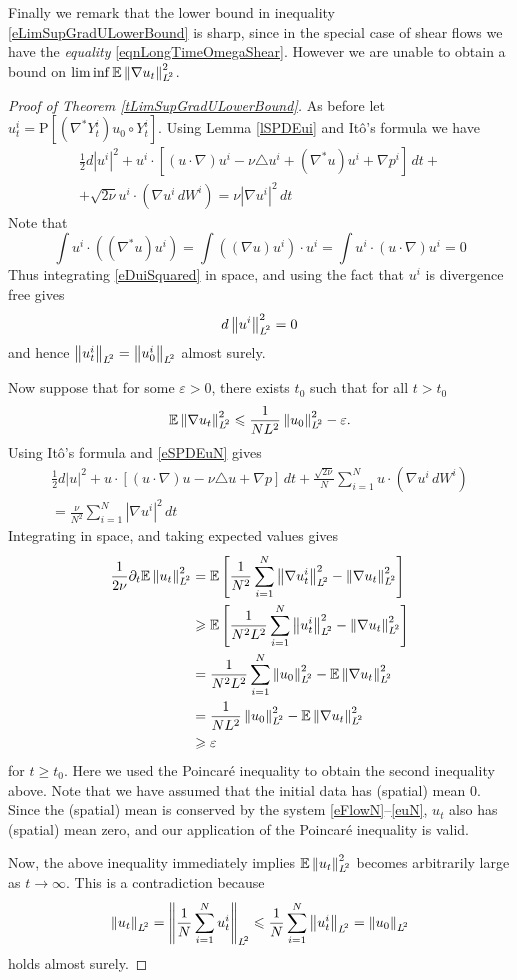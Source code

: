 \documentclass[final]{amsart}%
\newcommand{\mceuler}{\eqref{eFlowN}--\eqref{euN}\xspace}
\newcommand{\del}{\partial}
\newcommand{\lap}{\triangle}
\newcommand{\transpose}{^*}
\newcommand{\grad}{\nabla}
\newcommand{\gradt}{\grad\transpose}
\renewcommand{\epsilon}{\varepsilon}
\renewcommand{\leq}{\leqslant}
\renewcommand{\geq}{\geqslant}
\newcommand{\E}{\mathbb{E}}
\newcommand{\lhp}{\boldsymbol{\mathrm{P}}}
\newif\iftextstyle
\newcommand{\abs}[1]{\iftextstyle\lvert#1\rvert\else\left\lvert#1\right\rvert\fi}
\newcommand{\norm}[1]{\iftextstyle\lVert#1\rVert\else\left\lVert#1\right\rVert\fi}
\newcommand{\lpnorm}[2]{\norm{#1}_{\smash{L^{\!#2}_{\vphantom{h}}}\vphantom{L^{\!#2}}}}
\numberwithin{equation}{section}
\theoremstyle{definition}
\theoremstyle{remark}
\begin{document}
Finally we remark that the lower bound in inequality \eqref{eLimSupGradULowerBound} is sharp, since in the special case of shear flows we have the \textit{equality} \eqref{eqnLongTimeOmegaShear}. However we are unable to obtain a bound on $\liminf \E \lpnorm{\grad u_t}{2}^2$.

\begin{proof}[Proof of Theorem \ref{tLimSupGradULowerBound}]%
  As before let $u^i_t = \lhp\left[ (\gradt Y^i_t) u_0 \circ Y^i_t
  \right]$. Using Lemma \ref{lSPDEui} and It\^o's formula we have
\begin{multline}\label{eDuiSquared}
  \frac{1}{2} d \abs{u^i}^2 + u^i \cdot \left[ (u \cdot \grad) u^i -
    \nu \lap u^i + (\gradt u) u^i + \grad p^i \right] \, dt +\\ 
  + \sqrt{2 \nu} u^i \cdot (\grad u^i\, dW^i) = \nu \abs{\grad u^i}^2
  \, dt
\end{multline}
Note that
$$
\int u^i \cdot ((\gradt u) u^i) = \int ((\grad u) u^i) \cdot u^i =
\int u^i \cdot (u \cdot \grad) u^i = 0 
$$
Thus integrating \eqref{eDuiSquared} in space, and using the fact that
$u^i$ is divergence free gives
$$
d \lpnorm{u^i}{2}^2 = 0
$$
and hence $\lpnorm{u^i_t}{2} = \lpnorm{u^i_0}{2}$ almost
surely.\smallskip

Now suppose that for some $\epsilon > 0$, there exists $t_0$ such that for all $t > t_0$
$$
\E \lpnorm{ \grad u_t}{2}^2 \leq \frac{1}{N L^2} \lpnorm{u_0}{2}^2 - \epsilon.
$$
Using It\^o's formula and \eqref{eSPDEuN} gives
\begin{multline*}
  \frac{1}{2} d \abs{u}^2 + u \cdot \left[ (u \cdot \grad) u - \nu
    \lap u + \grad p \right] \, dt 
  + \frac{\sqrt{2 \nu}}{N} \sum_{i=1}^N u \cdot (\grad u^i\, dW^i) \\=
  \frac{\nu}{N^2} \sum_{i=1}^N \abs{\grad u^i}^2 \, dt
\end{multline*}
Integrating in space, and taking expected values gives
\begin{align*}
  \frac{1}{2\nu} \del_t \E \lpnorm{u_t}{2}^2 &= \E \left[
    \frac{1}{N^2} \sum_{i=1}^N \lpnorm{\grad u^i_t}{2}^2 -
    \lpnorm{\grad u_t}{2}^2 \right]\\ 
  &\geq \E \left[ \frac{1}{N^2 L^2} \sum_{i=1}^N \lpnorm{u^i_t}{2}^2 - \lpnorm{\grad u_t}{2}^2 \right]\\
  &= \frac{1}{N^2 L^2} \sum_{i=1}^N \lpnorm{u_0}{2}^2 - \E \lpnorm{\grad u_t}{2}^2\\
  &= \frac{1}{N L^2} \lpnorm{u_0}{2}^2 - \E \lpnorm{\grad u_t}{2}^2\\
  &\geq \epsilon
\end{align*}
for $t \geq t_0$. Here we used the Poincar\'e inequality to obtain the
second inequality above. Note that we have assumed that the initial
data has (spatial) mean $0$. Since the (spatial) mean is conserved by
the system \mceuler, $u_t$ also has (spatial) mean zero, and our
application of the Poincar\'e inequality is valid.

Now, the above inequality immediately implies $\E \lpnorm{ u_t }{2}^2$
becomes arbitrarily large as $t \to \infty$. This is a contradiction
because
$$
\lpnorm{u_t}{2} = \lpnorm{\frac{1}{N} \sum_{i=1}^N u^i_t }{2} \leq \frac{1}{N}
\sum_{i=1}^N \lpnorm{u^i_t}{2} = \lpnorm{u_0}{2}
$$
holds almost surely.
\end{proof}%
\end{document}
